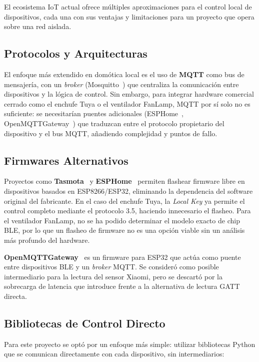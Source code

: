 El ecosistema IoT actual ofrece múltiples aproximaciones para el control local de dispositivos, cada una con sus ventajas y limitaciones para un proyecto que opera sobre una red aislada.

\subsection{Protocolos y Arquitecturas}

El enfoque más extendido en domótica local es el uso de \textbf{MQTT} como bus de mensajería, con un \textit{broker} (Mosquitto~\cite{mosquitto}) que centraliza la comunicación entre dispositivos y la lógica de control. Sin embargo, para integrar hardware comercial cerrado como el enchufe Tuya o el ventilador FanLamp, MQTT por sí solo no es suficiente: se necesitarían puentes adicionales (ESPHome~\cite{esphome}, OpenMQTTGateway~\cite{openmqttgw}) que traduzcan entre el protocolo propietario del dispositivo y el bus MQTT, añadiendo complejidad y puntos de fallo.

\subsection{Firmwares Alternativos}

Proyectos como \textbf{Tasmota}~\cite{tasmota} y \textbf{ESPHome}~\cite{esphome} permiten flashear firmware libre en dispositivos basados en ESP8266/ESP32, eliminando la dependencia del software original del fabricante. En el caso del enchufe Tuya, la \textit{Local Key} ya permite el control completo mediante el protocolo 3.5, haciendo innecesario el flasheo. Para el ventilador FanLamp, no se ha podido determinar el modelo exacto de chip BLE, por lo que un flasheo de firmware no es una opción viable sin un análisis más profundo del hardware.

\textbf{OpenMQTTGateway}~\cite{openmqttgw} es un firmware para ESP32 que actúa como puente entre dispositivos BLE y un \textit{broker} MQTT. Se consideró como posible intermediario para la lectura del sensor Xiaomi, pero se descartó por la sobrecarga de latencia que introduce frente a la alternativa de lectura GATT directa.

\subsection{Bibliotecas de Control Directo}

Para este proyecto se optó por un enfoque más simple: utilizar bibliotecas Python que se comunican directamente con cada dispositivo, sin intermediarios:

